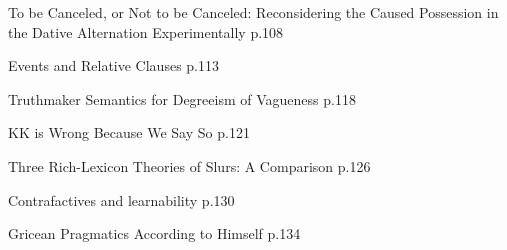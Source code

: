 \documentclass[12pt]{jarticle}
\begin{document}

  
     {To be Canceled, or Not to be Canceled: Reconsidering the Caused Possession in the Dative Alternation Experimentally}
     {p.108}
  
     {Events and Relative Clauses}
     {p.113}
  
     {Truthmaker Semantics for Degreeism of Vagueness}
     {p.118}




  
     {KK is Wrong Because We Say So}
     {p.121}
  
     {Three Rich-Lexicon Theories of Slurs: A Comparison}
     {p.126}
  
     {Contrafactives and learnability}
     {p.130}




  
     {Gricean Pragmatics According to Himself}
     {p.134}






  
\end{document}
